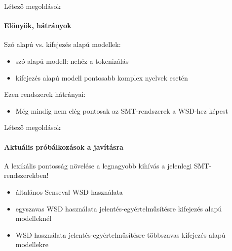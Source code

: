 \begin{frame}{Létező megoldások}
	\framesubtitle{Előnyök, hátrányok}
	
	Szó alapú vs. kifejezés alapú modellek: 
	\begin{itemize}
		\item
			szó alapú modell: nehéz a tokenizálás \cite{Lopez07asurvey}
		\item
			kifejezés alapú modell pontosabb komplex nyelvek esetén \cite{Lopez07asurvey}
		
	\end{itemize}
	
	Ezen rendszerek hátrányai:
	\begin{itemize}
		\item
			Még mindig nem elég pontosak az SMT-rendszerek a WSD-hez képest \cite{Carpuat_evaluatingthe}
	\end{itemize}
	
\end{frame}


\begin{frame}{Létező megoldások}
	\framesubtitle{Aktuális próbálkozások a javításra}
		
		A lexikális pontosság növelése a legnagyobb kihívás a jelenlegi SMT-rendszerekben!
		
	\begin{itemize}
		\item
			általános Senseval WSD használata \cite{carpuat2005}
		\item
			egyszavas WSD használata jelentés-egyértelműsítésre kifejezés alapú modelleknél \cite{Carpuat06towardintegrating}
		\item
			WSD használata jelentés-egyértelműsítésre többszavas kifejezés alapú modellekre \cite{Carpuat07improvingstatistical}
		
	\end{itemize}
\end{frame}


